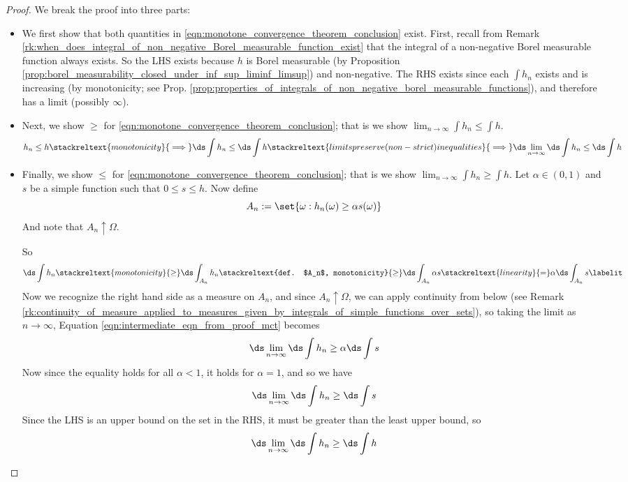 \documentclass{article} %
\begin{document}
\begin{proof}

We break the proof into three parts:
\begin{itemize}
\item We first show that both quantities in \eqref{eqn:monotone_convergence_theorem_conclusion} exist. First, recall from Remark \ref{rk:when_does_integral_of_non_negative_Borel_measurable_function_exist} that the integral of a non-negative Borel measurable function always exists. So the LHS exists because $h$ is Borel measurable (by Proposition \ref{prop:borel_measurability_closed_under_inf_sup_liminf_limsup}) and non-negative.  The RHS exists since each $\int h_n$ exists and is increasing (by monotonicity; see Prop. \ref{prop:properties_of_integrals_of_non_negative_borel_measurable_functions}), and therefore has a limit (possibly $\infty$). 

\item Next, we show $\geq$ for \eqref{eqn:monotone_convergence_theorem_conclusion}; that is we show $\lim_{n \to \infty} \int h_n \leq \int h$.
\[ h_n \leq h \stackreltext{monotonicity}{\implies} \ds\int h_n \leq \ds\int h \stackreltext{limits preserve (non-strict) inequalities}{\implies} \ds\lim_{n \to \infty} \ds\int h_n \leq \ds\int h \]

\item Finally, we show $\leq$ for \eqref{eqn:monotone_convergence_theorem_conclusion}; that is we show $\lim_{n \to \infty} \int h_n \geq \int h$.   Let $\alpha \in (0,1)$ and $s$ be a simple function such that $0 \leq s \leq h$.  Now define 
\[ A_n := \set{\omega : h_n(\omega) \geq \alpha s(\omega) }\]
And note that $A_n \uparrow \Omega$.

So
\begin{align*}
 \ds\int h_n  \stackreltext{monotonicity}{\geq} \ds\int_{A_n} h_n \stackreltext{def. $A_n$, monotonicity}{\geq} \ds\int_{A_n} \alpha s \stackreltext{linearity}{=} \alpha   \ds\int_{A_n} s 
 \labelit \label{eqn:intermediate_eqn_from_proof_mct} 
 \end{align*}
   Now we recognize the right hand side as a measure on $A_n$, and since $A_n \uparrow \Omega$, we can apply continuity from below (see Remark \ref{rk:continuity_of_measure_applied_to_measures_given_by_integrals_of_simple_functions_over_sets}), so taking the limit as $n \to \infty$, Equation \eqref{eqn:intermediate_eqn_from_proof_mct} becomes
\[  \ds\lim_{n \to \infty} \ds\int h_n  \geq \alpha \ds\int s \]
Now since the equality holds for all $\alpha <1$, it holds for $\alpha =1$, and so we have
\[   \ds\lim_{n \to \infty}  \ds\int h_n  \geq \ds\int s \]
Since the LHS is an upper bound on the set in the RHS, it must be greater than the least upper bound, so 
\[   \ds\lim_{n \to \infty}  \ds\int h_n  \geq \ds\int h \]
\end{itemize}
\end{proof}
\end{document}
